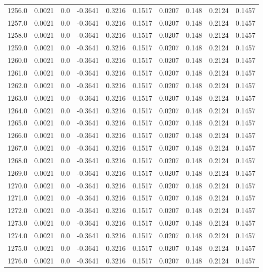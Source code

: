 \begin{longtable}{lrrrrrrrrr}
1256.0 & 0.0021 & 0.0 & -0.3641 & 0.3216 & 0.1517 & 0.0207 & 0.148 & 0.2124 & 0.1457 \\
1257.0 & 0.0021 & 0.0 & -0.3641 & 0.3216 & 0.1517 & 0.0207 & 0.148 & 0.2124 & 0.1457 \\
1258.0 & 0.0021 & 0.0 & -0.3641 & 0.3216 & 0.1517 & 0.0207 & 0.148 & 0.2124 & 0.1457 \\
1259.0 & 0.0021 & 0.0 & -0.3641 & 0.3216 & 0.1517 & 0.0207 & 0.148 & 0.2124 & 0.1457 \\
1260.0 & 0.0021 & 0.0 & -0.3641 & 0.3216 & 0.1517 & 0.0207 & 0.148 & 0.2124 & 0.1457 \\
1261.0 & 0.0021 & 0.0 & -0.3641 & 0.3216 & 0.1517 & 0.0207 & 0.148 & 0.2124 & 0.1457 \\
1262.0 & 0.0021 & 0.0 & -0.3641 & 0.3216 & 0.1517 & 0.0207 & 0.148 & 0.2124 & 0.1457 \\
1263.0 & 0.0021 & 0.0 & -0.3641 & 0.3216 & 0.1517 & 0.0207 & 0.148 & 0.2124 & 0.1457 \\
1264.0 & 0.0021 & 0.0 & -0.3641 & 0.3216 & 0.1517 & 0.0207 & 0.148 & 0.2124 & 0.1457 \\
1265.0 & 0.0021 & 0.0 & -0.3641 & 0.3216 & 0.1517 & 0.0207 & 0.148 & 0.2124 & 0.1457 \\
1266.0 & 0.0021 & 0.0 & -0.3641 & 0.3216 & 0.1517 & 0.0207 & 0.148 & 0.2124 & 0.1457 \\
1267.0 & 0.0021 & 0.0 & -0.3641 & 0.3216 & 0.1517 & 0.0207 & 0.148 & 0.2124 & 0.1457 \\
1268.0 & 0.0021 & 0.0 & -0.3641 & 0.3216 & 0.1517 & 0.0207 & 0.148 & 0.2124 & 0.1457 \\
1269.0 & 0.0021 & 0.0 & -0.3641 & 0.3216 & 0.1517 & 0.0207 & 0.148 & 0.2124 & 0.1457 \\
1270.0 & 0.0021 & 0.0 & -0.3641 & 0.3216 & 0.1517 & 0.0207 & 0.148 & 0.2124 & 0.1457 \\
1271.0 & 0.0021 & 0.0 & -0.3641 & 0.3216 & 0.1517 & 0.0207 & 0.148 & 0.2124 & 0.1457 \\
1272.0 & 0.0021 & 0.0 & -0.3641 & 0.3216 & 0.1517 & 0.0207 & 0.148 & 0.2124 & 0.1457 \\
1273.0 & 0.0021 & 0.0 & -0.3641 & 0.3216 & 0.1517 & 0.0207 & 0.148 & 0.2124 & 0.1457 \\
1274.0 & 0.0021 & 0.0 & -0.3641 & 0.3216 & 0.1517 & 0.0207 & 0.148 & 0.2124 & 0.1457 \\
1275.0 & 0.0021 & 0.0 & -0.3641 & 0.3216 & 0.1517 & 0.0207 & 0.148 & 0.2124 & 0.1457 \\
1276.0 & 0.0021 & 0.0 & -0.3641 & 0.3216 & 0.1517 & 0.0207 & 0.148 & 0.2124 & 0.1457 \\

\end{longtable}
